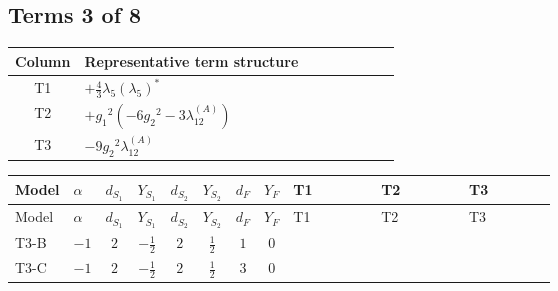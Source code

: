\documentclass[8pt]{article}
\begin{document}
\begin{landscape}
\subsection*{Terms 3 of 8}
\begin{center}
\begin{tabular}{@{}c >{\raggedright\arraybackslash}p{0.82\linewidth}@{}}
\toprule
Column & Representative term structure \\
\midrule
T1 & \(\displaystyle +\frac{4}{3} {\lambda_5} \left({\lambda_5}\right)^{*}\) \\
\midrule
T2 & \(\displaystyle +{g_1}^2 \left(-6 {g_2}^2-3 {\lambda_{12}^{(A)}}\right)\) \\
\midrule
T3 & \(\displaystyle -9 {g_2}^2 {\lambda_{12}^{(A)}}\) \\
\midrule
\bottomrule
\end{tabular}
\end{center}
\smallskip
\tiny
\begin{longtable}{@{}llcccccc >{\raggedright\arraybackslash}p{0.21\linewidth} >{\raggedright\arraybackslash}p{0.21\linewidth} >{\raggedright\arraybackslash}p{0.21\linewidth}@{}}
\toprule
Model & $\alpha$ & $d_{S_1}$ & $Y_{S_1}$ & $d_{S_2}$ & $Y_{S_2}$ & $d_F$ & $Y_F$ & T1 & T2 & T3 \\
\midrule
\endfirsthead
\toprule
Model & $\alpha$ & $d_{S_1}$ & $Y_{S_1}$ & $d_{S_2}$ & $Y_{S_2}$ & $d_F$ & $Y_F$ & T1 & T2 & T3 \\
\midrule
\endhead
T3-B & $-1$ & $2$ & $-\frac{1}{2}$ & $2$ & $\frac{1}{2}$ & $1$ & $0$ & \scriptsize\adjustbox{max width=\linewidth}{$\begin{gathered} +\frac{4}{3} {\lambda_5} \left({\lambda_5}\right)^{*}\end{gathered}$} & \scriptsize\adjustbox{max width=\linewidth}{$\begin{gathered} +{g_1}^2 \left(-6 {g_2}^2-3 {\lambda_{12}^{(A)}}\right)\end{gathered}$} & \scriptsize\adjustbox{max width=\linewidth}{$\begin{gathered} -9 {g_2}^2 {\lambda_{12}^{(A)}}\end{gathered}$} \\
\midrule
T3-C & $-1$ & $2$ & $-\frac{1}{2}$ & $2$ & $\frac{1}{2}$ & $3$ & $0$ & \scriptsize\adjustbox{max width=\linewidth}{$\begin{gathered} +\frac{4}{3} {\lambda_5} \left({\lambda_5}\right)^{*}\end{gathered}$} & \scriptsize\adjustbox{max width=\linewidth}{$\begin{gathered} +{g_1}^2 \left(-6 {g_2}^2-3 {\lambda_{12}^{(A)}}\right)\end{gathered}$} & \scriptsize\adjustbox{max width=\linewidth}{$\begin{gathered} -9 {g_2}^2 {\lambda_{12}^{(A)}}\end{gathered}$} \\

\end{longtable}
\end{landscape}
\end{document}
